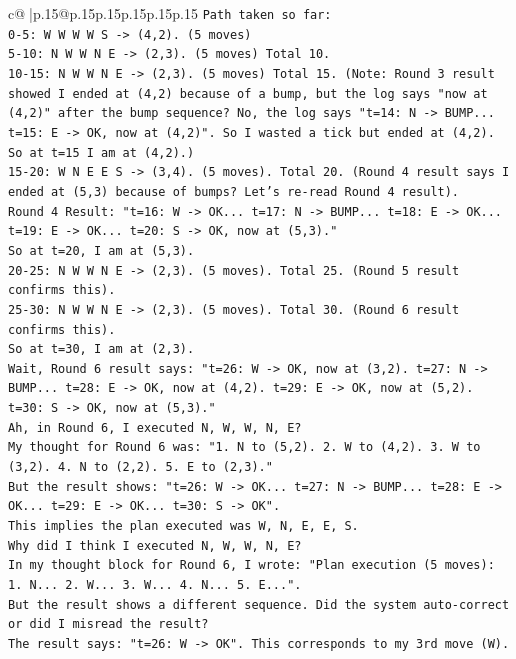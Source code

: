 \documentclass{article}
\begin{document}
{\begin{supertabular}{c@{$\;$}|p{.15\linewidth}@{}p{.15\linewidth}p{.15\linewidth}p{.15\linewidth}p{.15\linewidth}p{.15\linewidth}}
{{{\texttt{Path taken so far:} \\
\texttt{0{-}5: W W W W S {-}> (4,2). (5 moves)} \\
\texttt{5{-}10: N W W N E {-}> (2,3). (5 moves) Total 10.} \\
\texttt{10{-}15: N W W N E {-}> (2,3). (5 moves) Total 15. (Note: Round 3 result showed I ended at (4,2) because of a bump, but the log says "now at (4,2)" after the bump sequence? No, the log says "t=14: N {-}> BUMP... t=15: E {-}> OK, now at (4,2)". So I wasted a tick but ended at (4,2). So at t=15 I am at (4,2).)} \\
\texttt{15{-}20: W N E E S {-}> (3,4). (5 moves). Total 20. (Round 4 result says I ended at (5,3) because of bumps? Let's re{-}read Round 4 result).} \\
\texttt{Round 4 Result: "t=16: W {-}> OK... t=17: N {-}> BUMP... t=18: E {-}> OK... t=19: E {-}> OK... t=20: S {-}> OK, now at (5,3)."} \\
\texttt{So at t=20, I am at (5,3).} \\
\texttt{20{-}25: N W W N E {-}> (2,3). (5 moves). Total 25. (Round 5 result confirms this).} \\
\texttt{25{-}30: N W W N E {-}> (2,3). (5 moves). Total 30. (Round 6 result confirms this).} \\
\texttt{So at t=30, I am at (2,3).} \\
\texttt{Wait, Round 6 result says: "t=26: W {-}> OK, now at (3,2). t=27: N {-}> BUMP... t=28: E {-}> OK, now at (4,2). t=29: E {-}> OK, now at (5,2). t=30: S {-}> OK, now at (5,3)."} \\
\texttt{Ah, in Round 6, I executed N, W, W, N, E?} \\
\texttt{My thought for Round 6 was: "1. N to (5,2). 2. W to (4,2). 3. W to (3,2). 4. N to (2,2). 5. E to (2,3)."} \\
\texttt{But the result shows: "t=26: W {-}> OK... t=27: N {-}> BUMP... t=28: E {-}> OK... t=29: E {-}> OK... t=30: S {-}> OK".} \\
\texttt{This implies the plan executed was W, N, E, E, S.} \\
\texttt{Why did I think I executed N, W, W, N, E?} \\
\texttt{In my thought block for Round 6, I wrote: "Plan execution (5 moves): 1. N... 2. W... 3. W... 4. N... 5. E...".} \\
\texttt{But the result shows a different sequence. Did the system auto{-}correct or did I misread the result?} \\
\texttt{The result says: "t=26: W {-}> OK". This corresponds to my 3rd move (W).} \\
}}}
\end{supertabular}}
\end{document}
